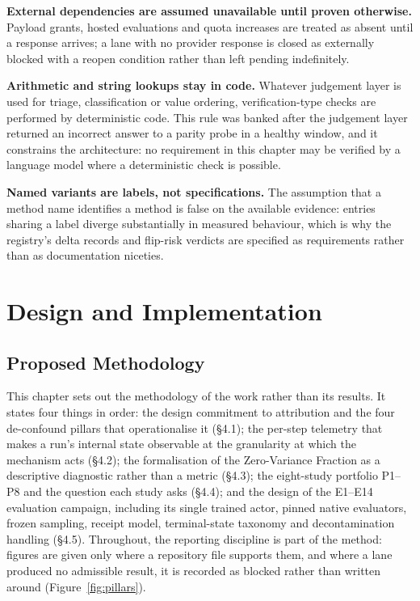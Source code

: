 \documentclass[12pt,a4paper]{report}
\begin{document}
\textbf{External dependencies are assumed unavailable until proven
otherwise.} Payload grants, hosted evaluations and quota increases are
treated as absent until a response arrives; a lane with no provider
response is closed as externally blocked with a reopen condition rather
than left pending indefinitely.

\textbf{Arithmetic and string lookups stay in code.} Whatever judgement
layer is used for triage, classification or value ordering,
verification-type checks are performed by deterministic code. This rule
was banked after the judgement layer returned an incorrect answer to a
parity probe in a healthy window, and it constrains the architecture: no
requirement in this chapter may be verified by a language model where a
deterministic check is possible.

\textbf{Named variants are labels, not specifications.} The assumption
that a method name identifies a method is false on the available
evidence: entries sharing a label diverge substantially in measured
behaviour, which is why the registry's delta records and flip-risk
verdicts are specified as requirements rather than as documentation
niceties.



\part{Design and Implementation}


\chapter{Proposed Methodology}\label{proposed-methodology}

This chapter sets out the methodology of the work rather than its
results. It states four things in order: the design commitment to
attribution and the four de-confound pillars that operationalise it
(§4.1); the per-step telemetry that makes a run's internal state
observable at the granularity at which the mechanism acts (§4.2); the
formalisation of the Zero-Variance Fraction as a descriptive diagnostic
rather than a metric (§4.3); the eight-study portfolio P1--P8 and the
question each study asks (§4.4); and the design of the E1--E14
evaluation campaign, including its single trained actor, pinned native
evaluators, frozen sampling, receipt model, terminal-state taxonomy and
decontamination handling (§4.5). Throughout, the reporting discipline is
part of the method: figures are given only where a repository file
supports them, and where a lane produced no admissible result, it is
recorded as blocked rather than written around (Figure~\ref{fig:pillars}).
\end{document}

